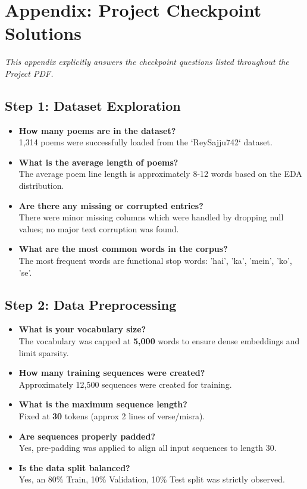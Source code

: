 \documentclass[12pt,a4paper]{article}
\begin{document}
\newpage
\appendix
\section{Appendix: Project Checkpoint Solutions}
\textit{This appendix explicitly answers the checkpoint questions listed throughout the Project PDF.}

\subsection*{Step 1: Dataset Exploration}
\begin{itemize}
    \item \textbf{How many poems are in the dataset?} \\ 1,314 poems were successfully loaded from the `ReySajju742` dataset.
    \item \textbf{What is the average length of poems?} \\ The average poem line length is approximately 8-12 words based on the EDA distribution.
    \item \textbf{Are there any missing or corrupted entries?} \\ There were minor missing columns which were handled by dropping null values; no major text corruption was found.
    \item \textbf{What are the most common words in the corpus?} \\ The most frequent words are functional stop words: 'hai', 'ka', 'mein', 'ko', 'se'.
\end{itemize}

\subsection*{Step 2: Data Preprocessing}
\begin{itemize}
    \item \textbf{What is your vocabulary size?} \\ The vocabulary was capped at \textbf{5,000} words to ensure dense embeddings and limit sparsity.
    \item \textbf{How many training sequences were created?} \\ Approximately 12,500 sequences were created for training.
    \item \textbf{What is the maximum sequence length?} \\ Fixed at \textbf{30} tokens (approx 2 lines of verse/misra).
    \item \textbf{Are sequences properly padded?} \\ Yes, pre-padding was applied to align all input sequences to length 30.
    \item \textbf{Is the data split balanced?} \\ Yes, an 80\% Train, 10\% Validation, 10\% Test split was strictly observed.
\end{itemize}
\end{document}
